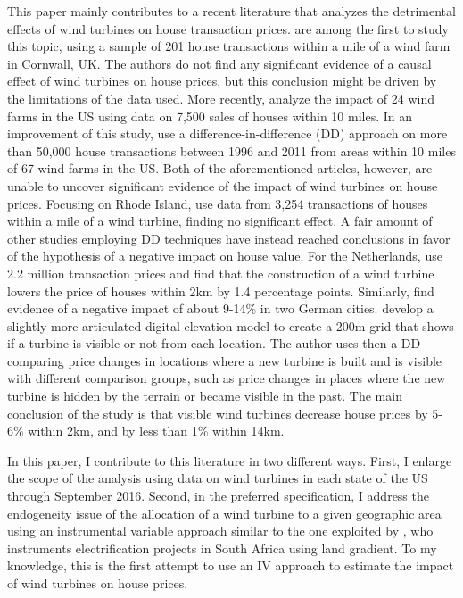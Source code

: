 \documentclass[twoside,12pt]{article}
\begin{document}
This paper mainly contributes to a recent literature that analyzes the detrimental effects of wind turbines on house transaction prices. \cite{sims2008modelling} are among the first to study this topic, using a sample of 201 house transactions within a mile of a wind farm in Cornwall, UK. The authors do not find any significant evidence of a causal effect of wind turbines on house prices, but this conclusion might be driven by the limitations of the data used. More recently, \cite{hoen2009impact} analyze the impact of 24 wind farms in the US using data on 7,500 sales of houses within 10 miles. In an improvement of this study, \cite{hoen2013spatial} use a difference-in-difference (DD) approach on more than 50,000 house transactions between 1996 and 2011 from areas within 10 miles of 67 wind farms in the US. Both of the aforementioned articles, however, are unable to uncover significant evidence of the impact of wind turbines on house prices. Focusing on Rhode Island, \cite{lang2014windy} use data from 3,254 transactions of houses within a mile of a wind turbine, finding no significant effect. A fair amount of other studies employing DD techniques have instead reached conclusions in favor of the hypothesis of a negative impact on house value. For the Netherlands, \cite{droes2014renewable} use 2.2 million transaction prices and find that the construction of a wind turbine lowers the price of houses within 2km by 1.4 percentage points. Similarly, \cite{sunak2016impact} find evidence of a negative impact of about 9-14\% in two German cities. \cite{gibbons2015gone} develop a slightly more articulated digital elevation model to create a 200m grid that shows if a turbine is visible or not from each location. The author uses then a DD comparing price changes in locations where a new turbine is built and is visible with different comparison groups, such as price changes in places where the new turbine is hidden by the terrain or became visible in the past. The main conclusion of the study is that visible wind turbines decrease house prices by 5-6\% within 2km, and by less than 1\% within 14km.

In this paper, I contribute to this literature in two different ways. First, I enlarge the scope of the analysis using data on wind turbines in each state of the US through September 2016. Second, in the preferred specification, I address the endogeneity issue of the allocation of a wind turbine to a given geographic area using an instrumental variable approach similar to the one exploited by \cite{dinkelman2011effects}, who instruments electrification projects in South Africa using land gradient. To my knowledge, this is the first attempt to use an IV approach to estimate the impact of wind turbines on house prices.
\end{document}

